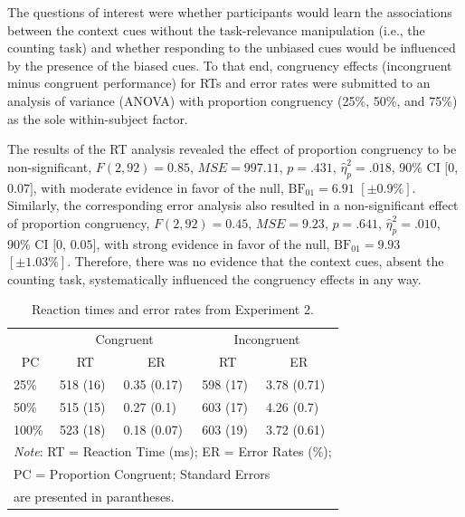 \documentclass[english,,man,floatsintext]{apa6}
\begin{document}
The questions of interest were whether participants would learn the associations between the context cues without the task-relevance manipulation (i.e., the counting task) and whether responding to the unbiased cues would be influenced by the presence of the biased cues. To that end, congruency effects (incongruent minus congruent performance) for RTs and error rates were submitted to an analysis of variance (ANOVA) with proportion congruency (25\%, 50\%, and 75\%) as the sole within-subject factor.

The results of the RT analysis revealed the effect of proportion congruency to be non-significant, \(F(2, 92) = 0.85\), \(\mathit{MSE} = 997.11\), \(p = .431\), \(\hat{\eta}^2_p = .018\), 90\% CI \([0\), \(0.07]\), with moderate evidence in favor of the null, \(\mathrm{BF}_{\textrm{01}} = 6.91\) \([\pm 0.9\%]\). Similarly, the corresponding error analysis also resulted in a non-significant effect of proportion congruency, \(F(2, 92) = 0.45\), \(\mathit{MSE} = 9.23\), \(p = .641\), \(\hat{\eta}^2_p = .010\), 90\% CI \([0\), \(0.05]\), with strong evidence in favor of the null, \(\mathrm{BF}_{\textrm{01}} = 9.93\) \([\pm 1.03\%]\). Therefore, there was no evidence that the context cues, absent the counting task, systematically influenced the congruency effects in any way.

\begin{table}[htbp]
\caption{Reaction times and error rates from Experiment 2.}
\label{TR_table_2}
\centering
\begin{tabular}{lcccc}
\toprule
& \multicolumn{2}{c}{Congruent} & \multicolumn{2}{c}{Incongruent} \\
\cmidrule(rl){2-3}
\cmidrule(rl){4-5}
\multicolumn{1}{c}{PC} & \multicolumn{1}{c}{RT} & \multicolumn{1}{c}{ER} & \multicolumn{1}{c}{RT} & \multicolumn{1}{c}{ER}  \\
\midrule
\multicolumn{1}{l}{25\%} & \multicolumn{1}{l}{518 (16)} & \multicolumn{1}{l}{0.35 (0.17)} & \multicolumn{1}{l}{598 (17)} & \multicolumn{1}{l}{3.78 (0.71)} \\
\multicolumn{1}{l}{50\%} & \multicolumn{1}{l}{515 (15)} & \multicolumn{1}{l}{0.27 (0.1)} & \multicolumn{1}{l}{603 (17)} & \multicolumn{1}{l}{4.26 (0.7)} \\
\multicolumn{1}{l}{100\%} & \multicolumn{1}{l}{523 (18)} & \multicolumn{1}{l}{0.18 (0.07)} & \multicolumn{1}{l}{603 (19)} & \multicolumn{1}{l}{3.72 (0.61)} \\
\bottomrule
\multicolumn{5}{l}{\textit{Note}: RT = Reaction Time (ms);  ER = Error Rates (\%);} \\
\multicolumn{5}{l}{PC = Proportion Congruent; Standard Errors} \\
\multicolumn{5}{l}{are presented in parantheses.} \\
\end{tabular}%
\end{table}
\end{document}
